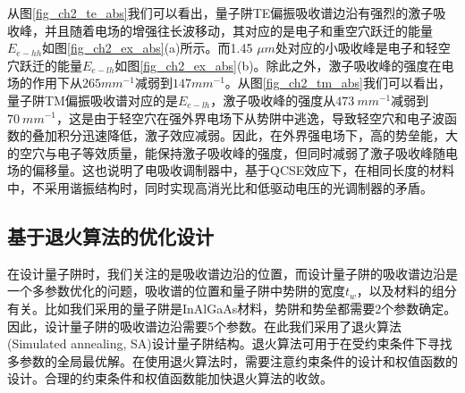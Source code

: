 从图\ref{fig_ch2_te_abs}我们可以看出，量子阱TE偏振吸收谱边沿有强烈的激子吸收峰，并且随着电场的增强往长波移动，其对应的是电子和重空穴跃迁的能量$E_{e-hh}$如图\ref{fig_ch2_ex_abs}(a)所示。而1.45 $\mu m$处对应的小吸收峰是电子和轻空穴跃迁的能量$E_{e-lh}$如图\ref{fig_ch2_ex_abs}(b)。除此之外，激子吸收峰的强度在电场的作用下从$265 mm^{-1}$减弱到$147 mm^{-1}$。从图\ref{fig_ch2_tm_abs}我们可以看出，量子阱TM偏振吸收谱对应的是$E_{e-lh}$，激子吸收峰的强度从$473~ mm^{-1}$减弱到$70~ mm^{-1}$，这是由于轻空穴在强外界电场下从势阱中逃逸，导致轻空穴和电子波函数的叠加积分迅速降低，激子效应减弱。因此，在外界强电场下，高的势垒能，大的空穴与电子等效质量，能保持激子吸收峰的强度，但同时减弱了激子吸收峰随电场的偏移量。这也说明了电吸收调制器中，基于QCSE效应下，在相同长度的材料中，不采用谐振结构时，同时实现高消光比和低驱动电压的光调制器的矛盾。

\subsection{基于退火算法的优化设计}
在设计量子阱时，我们关注的是吸收谱边沿的位置，而设计量子阱的吸收谱边沿是一个多参数优化的问题，吸收谱的位置和量子阱中势阱的宽度$t_w$，以及材料的组分有关。比如我们采用的量子阱是InAlGaAs材料，势阱和势垒都需要2个参数确定。因此，设计量子阱的吸收谱边沿需要5个参数。在此我们采用了退火算法(Simulated annealing, SA)\cite{Kirkpatrick671}设计量子阱结构。退火算法可用于在受约束条件下寻找多参数的全局最优解。在使用退火算法时，需要注意约束条件的设计和权值函数的设计。合理的约束条件和权值函数能加快退火算法的收敛。

